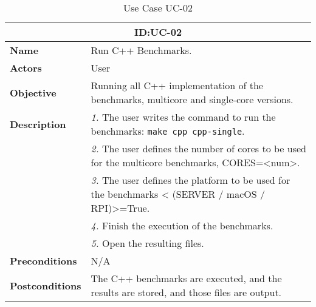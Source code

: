 \begin{table}[H]
    \centering
    \begin{tabular}{l p{10cm}}
        \toprule
        \multicolumn{2}{c}{\textbf{ID:\@ UC-02}} \\
        \toprule
        \textbf{Name}                         &  Run C++ Benchmarks. \\
        \textbf{Actors}                       &  User \\
        \textbf{Objective}                    &  Running all C++ implementation of the benchmarks, multicore and single-core versions. \\
        \multirow{1}{*}{\textbf{Description}} & \textsl{1.} The user writes the command to run the benchmarks: \texttt{make cpp cpp-single}.\\
                                              & \textsl{2.} The user defines the number of cores to be used for the multicore benchmarks, CORES=<num>.\\
                                              & \textsl{3.} The user defines the platform to be used for the benchmarks < (SERVER / macOS / RPI)>=True.\\
                                              & \textsl{4.} Finish the execution of the benchmarks.\\
                                              & \textsl{5.} Open the resulting files.\\
        \textbf{Preconditions}                &  N/A \\
        \textbf{Postconditions}               &  The C++ benchmarks are executed, and the results are stored, and those files are output. \\
    \end{tabular}
    \caption{Use Case UC-02}\label{tab:uc-single-core 02}
\end{table}

